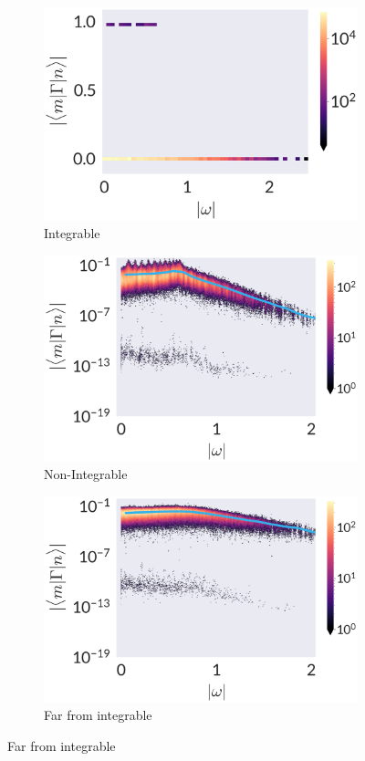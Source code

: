 \begin{figure}
\centering
\begin{subfigure}[t]{0.33\textwidth}
	\centering
\includegraphics[width=\columnwidth]{figures/chapter1/Gamma-OffOmega-I.png}
\caption{Integrable}
\end{subfigure}%
\begin{subfigure}[t]{0.33\textwidth}
	\centering
\includegraphics[width=\columnwidth]{figures/chapter1/Gamma-OffOmega-01.png}
\caption{Non-Integrable}
\end{subfigure}%
\begin{subfigure}[t]{0.33\textwidth}
	\centering
\includegraphics[width=\columnwidth]{figures/chapter1/Gamma-OffOmega-NI.png}
\caption{Far from integrable}
\end{subfigure}


\end{figure}

